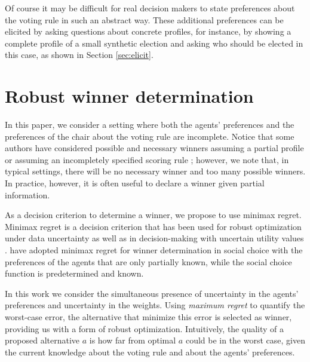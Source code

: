 Of course it may be difficult for real decision makers to state preferences about the voting rule in such an abstract way.
These additional preferences can be elicited by asking questions about concrete profiles, for instance, by showing a complete profile of a small synthetic election and asking who should be elected in this case, as shown in Section \ref{sec:elicit}.

\section[Minimax regret under partial profile and weight information]{
Robust winner determination}
\label{sec:mmr}

In this paper, we consider a setting where both the agents' preferences and the preferences of the chair about the voting rule are incomplete.
Notice that some authors have considered possible and necessary winners assuming a partial profile  \citep{Xia2008} or assuming an incompletely specified scoring rule \citep{Viappiani2018};
however, we note that, in typical settings, there will be no necessary winner and too many possible winners.
In practice, however, it is often useful to declare a winner given partial information.

As a decision criterion to determine a winner, we propose to use minimax regret. 
Minimax regret \citep{Savage1954} is a decision criterion that has been used for robust optimization under data uncertainty \citep{Kouvelis1997} as well as in decision-making with uncertain utility values \citep{Salo2001,Boutilier2006}.
\citet{Lu2011} have adopted minimax regret for winner determination in social choice with
the preferences of the agents that are only partially known, while the social choice function is predetermined and known.

In this work we consider the simultaneous presence of uncertainty in the agents' preferences and uncertainty in the weights.
Using {\em maximum regret} to quantify the worst-case error, the alternative that minimize this error is selected as winner, providing us with a form of robust optimization.
Intuitively, the quality of a proposed alternative $a$ is how far from optimal $a$  could be in the worst case, given the current knowledge about the voting rule and about the agents' preferences.

